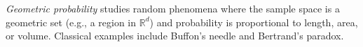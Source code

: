 \textit{Geometric probability} studies random phenomena where the sample space is a geometric set (e.g., a region in $\mathbb{R}^d$) and probability is proportional to length, area, or volume. Classical examples include Buffon's needle and Bertrand's paradox.
